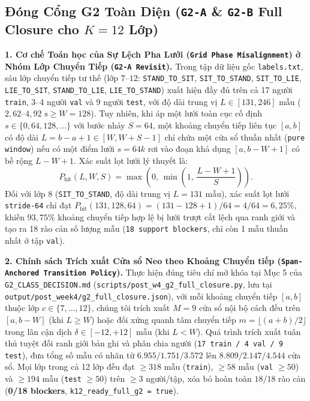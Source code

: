 \documentclass[11pt,a4paper]{article}
\newcommand{\code}[1]{{\small\ttfamily\nolinkurl{#1}}}
\theoremstyle{remark}
\begin{document}
\subsection{\texorpdfstring{Đóng Cổng G2 Toàn Diện (\texttt{G2-A} \& \texttt{G2-B} Full Closure cho $K=12$ Lớp)}{Đóng Cổng G2 Toàn Diện (G2-A và G2-B Full Closure cho K=12 Lớp)}}

\textbf{1. Cơ chế Toán học của Sự Lệch Pha Lưới (\code{Grid Phase Misalignment}) ở Nhóm Lớp Chuyển Tiếp (\code{G2-A Revisit}).}
Trong tập dữ liệu gốc \code{labels.txt}, sáu lớp chuyển tiếp tư thế (lớp $7$--$12$: \code{STAND\_TO\_SIT}, \code{SIT\_TO\_STAND}, \code{SIT\_TO\_LIE}, \code{LIE\_TO\_SIT}, \code{STAND\_TO\_LIE}, \code{LIE\_TO\_STAND}) xuất hiện đầy đủ trên cả 17 người \code{train}, 3--4 người \code{val} và 9 người \code{test}, với độ dài trung vị $L \in [131, 246]$ mẫu ($2,62$--$4,92\text{ s} \ge W = 128$). Tuy nhiên, khi áp một lưới toàn cục cố định $s \in \{0, 64, 128, \dots\}$ với bước nhảy $S = 64$, một khoảng chuyển tiếp liên tục $[a, b]$ có độ dài $L = b - a + 1 \in [W, W + S - 1]$ chỉ chứa một cửa sổ thuần nhất (\code{pure window}) nếu có một điểm lưới $s = 64k$ rơi vào đoạn khả dụng $[a, b - W + 1]$ có bề rộng $L - W + 1$. Xác suất lọt lưới lý thuyết là:
\begin{equation}
  P_{\text{hit}}(L, W, S) = \max\!\left(0, \, \min\!\left(1, \, \frac{L - W + 1}{S}\right)\right).
\end{equation}
Đối với lớp 8 (\code{SIT\_TO\_STAND}, độ dài trung vị $L = 131$ mẫu), xác suất lọt lưới \code{stride-64} chỉ đạt $P_{\text{hit}}(131, 128, 64) = (131 - 128 + 1)/64 = 4/64 = 6,25\%$, khiến $93,75\%$ khoảng chuyển tiếp hợp lệ bị lưới trượt cắt lệch qua ranh giới và tạo ra 18 rào cản số lượng mẫu (\code{18 support blockers}, chỉ còn 1 mẫu thuần nhất ở tập \code{val}).

\textbf{2. Chính sách Trích xuất Cửa sổ Neo theo Khoảng Chuyển tiếp (\code{Span-Anchored Transition Policy}).}
Thực hiện đúng tiêu chí mở khóa tại Mục 5 của \code{G2\_CLASS\_DECISION.md} (\code{scripts/post\_w4\_g2\_full\_closure.py}, lưu tại \code{output/post\_week4/g2\_full\_closure.json}), với mỗi khoảng chuyển tiếp $[a, b]$ thuộc lớp $c \in \{7,\dots,12\}$, chúng tôi trích xuất $M = 9$ cửa sổ nội bộ cách đều trên $[a, b - W]$ (khi $L \ge W$) hoặc đối xứng quanh tâm chuyển tiếp $m = \lfloor(a+b)/2\rfloor$ trong lân cận dịch $\delta \in [-12, +12]$ mẫu (khi $L < W$). Quá trình trích xuất tuân thủ tuyệt đối ranh giới bản ghi và phân chia người (\code{17 train / 4 val / 9 test}), đưa tổng số mẫu có nhãn từ $6.955 / 1.751 / 3.572$ lên $8.809 / 2.147 / 4.544$ cửa sổ. Mọi lớp trong cả 12 lớp đều đạt $\ge 318$ mẫu (\code{train}), $\ge 58$ mẫu (\code{val} $\ge 50$) và $\ge 194$ mẫu (\code{test} $\ge 50$) trên $\ge 3$ người/tập, xóa bỏ hoàn toàn $18/18$ rào cản (\textbf{0/18 blockers}, \code{k12\_ready\_full\_g2 = true}).
\end{document}
